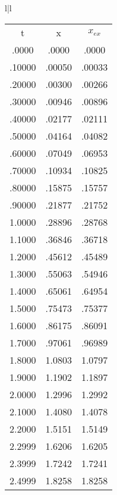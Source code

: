 \begin{figure}
    \centering
    \begin{tabular}{l|l}
        \begin{tabular}{ccc}
            \multicolumn{1}{c}{t} &  \multicolumn{1}{c}{x}  & \multicolumn{1}{c}{$x_{ex}$}\\
                .0000  & .0000  & .0000   \\
                .10000 & .00050 & .00033  \\
                .20000 & .00300 & .00266  \\
                .30000 & .00946 & .00896  \\
                .40000 & .02177 & .02111  \\
                .50000 & .04164 & .04082  \\
                .60000 & .07049 & .06953  \\
                .70000 & .10934 & .10825  \\
                .80000 & .15875 & .15757  \\
                .90000 & .21877 & .21752  \\
                1.0000 & .28896 & .28768  \\
                1.1000 & .36846 & .36718  \\
                1.2000 & .45612 & .45489  \\
                1.3000 & .55063 & .54946  \\
                1.4000 & .65061 & .64954  \\
                1.5000 & .75473 & .75377  \\
                1.6000 & .86175 & .86091  \\
                1.7000 & .97061 & .96989  \\
                1.8000 & 1.0803 & 1.0797  \\
                1.9000 & 1.1902 & 1.1897  \\
                2.0000 & 1.2996 & 1.2992  \\
                2.1000 & 1.4080 & 1.4078  \\
                2.2000 & 1.5151 & 1.5149  \\
                2.2999 & 1.6206 & 1.6205  \\
                2.3999 & 1.7242 & 1.7241  \\
                2.4999 & 1.8258 & 1.8258  \\
            \end{tabular}

\end{tabular}
\end{figure}
